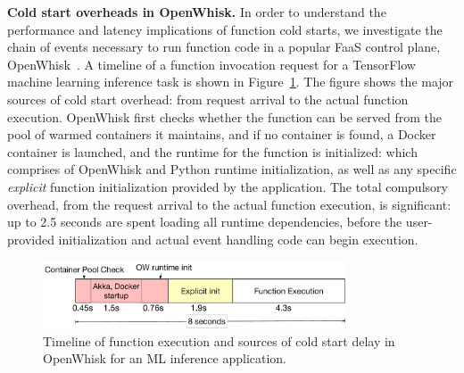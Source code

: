 \noindent \textbf{Cold start overheads in OpenWhisk.} 
%
In order to understand the performance and latency implications of function cold starts, we investigate the chain of events necessary to run function code in a popular FaaS control plane, OpenWhisk~\cite{openwhisk}.  
A timeline of a function invocation request for a TensorFlow machine learning inference task is shown in Figure~\ref{fig:timeline}. 
The figure shows the major sources of cold start overhead: from request arrival to the actual function execution. 
OpenWhisk first checks whether the function can be served from the  pool of warmed containers it maintains, and if no container is found, a Docker container is launched, and the runtime for the function is initialized: which comprises of OpenWhisk and Python runtime initialization, as well as any specific \emph{explicit} function initialization provided by the application. 
The total compulsory overhead, from the request arrival to the actual function execution, is significant: up to 2.5 seconds are spent loading all runtime dependencies, before the user-provided initialization and actual event handling code can begin execution. 


\begin{figure}[t]
  \centering
  \includegraphics[width=0.8\textwidth]{faascache/faas-keepalive-20/figures/ow-timeline.pdf}
  \caption{Timeline of function execution and sources of cold start delay in OpenWhisk for an ML inference application.}
  \label{fig:timeline}
\end{figure}


